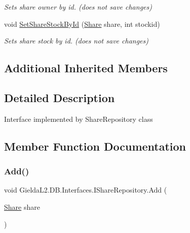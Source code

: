 \begin{DoxyCompactItemize}
\begin{DoxyCompactList}\small\item\em Sets share owner by id. (does not save changes) \end{DoxyCompactList}\item 
void \mbox{\hyperlink{interface_gielda_l2_1_1_d_b_1_1_interfaces_1_1_i_share_repository_ac790aa8aa9cb7cbaeb91b0c6201abf76}{Set\+Share\+Stock\+By\+Id}} (\mbox{\hyperlink{class_gielda_l2_1_1_d_b_1_1_entities_1_1_share}{Share}} share, int stockid)
\begin{DoxyCompactList}\small\item\em Sets share stock by id. (does not save changes) \end{DoxyCompactList}\end{DoxyCompactItemize}
\subsection*{Additional Inherited Members}


\subsection{Detailed Description}
Interface implemented by Share\+Repository class 



\subsection{Member Function Documentation}
\mbox{\label{interface_gielda_l2_1_1_d_b_1_1_interfaces_1_1_i_share_repository_a92f21844eefac0604d9d195aa1f15214}} 
\subsubsection{\texorpdfstring{Add()}{Add()}}
{\footnotesize\ttfamily void Gielda\+L2.\+D\+B.\+Interfaces.\+I\+Share\+Repository.\+Add (\begin{DoxyParamCaption}\item[{\mbox{\hyperlink{class_gielda_l2_1_1_d_b_1_1_entities_1_1_share}{Share}}}]{share }\end{DoxyParamCaption})}



